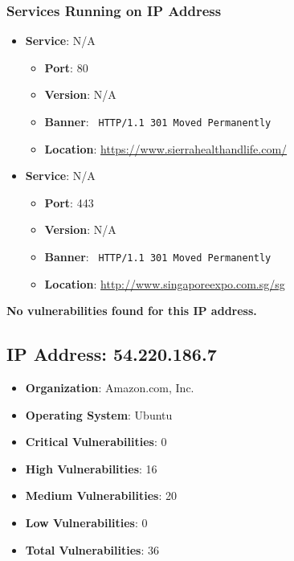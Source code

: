 \documentclass{article}
\begin{document}
\subsubsection*{Services Running on IP Address}

\begin{itemize}
    
        \item \textbf{Service}: N/A
        \begin{itemize}
            \item \textbf{Port}: 80
            \item \textbf{Version}:  N/A 
            \item \textbf{Banner}: \texttt{ HTTP/1.1 301 Moved Permanently
 }
            \item \textbf{Location}: \href{ https://www.sierrahealthandlife.com/ }{ https://www.sierrahealthandlife.com/ }
        \end{itemize}
    
        \item \textbf{Service}: N/A
        \begin{itemize}
            \item \textbf{Port}: 443
            \item \textbf{Version}:  N/A 
            \item \textbf{Banner}: \texttt{ HTTP/1.1 301 Moved Permanently
 }
            \item \textbf{Location}: \href{ http://www.singaporeexpo.com.sg/sg }{ http://www.singaporeexpo.com.sg/sg }
        \end{itemize}
    
\end{itemize}


\textbf{No vulnerabilities found for this IP address.}


\clearpage



\subsection*{IP Address: 54.220.186.7}

\begin{itemize}
    \item \textbf{Organization}: Amazon.com, Inc.
    \item \textbf{Operating System}:  Ubuntu 
    \item \textbf{Critical Vulnerabilities}: 0
    \item \textbf{High Vulnerabilities}: 16
    \item \textbf{Medium Vulnerabilities}: 20
    \item \textbf{Low Vulnerabilities}: 0
    \item \textbf{Total Vulnerabilities}: 36
\end{itemize}
\end{document}
